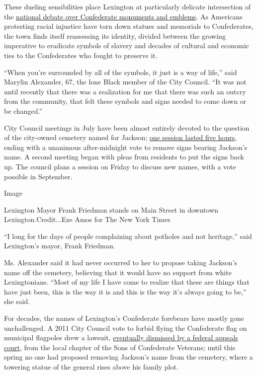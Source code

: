 These dueling sensibilities place Lexington at particularly delicate
intersection of the
\href{https://www.nytimes.com/2020/06/24/us/confederate-statues-photos.html}{national
debate over Confederate monuments and emblems}. As Americans protesting
racial injustice have torn down statues and memorials to Confederates,
the town finds itself reassessing its identity, divided between the
growing imperative to eradicate symbols of slavery and decades of
cultural and economic ties to the Confederates who fought to preserve
it.

``When you're surrounded by all of the symbols, it just is a way of
life,'' said Marylin Alexander, 67, the lone Black member of the City
Council. ``It was not until recently that there was a realization for me
that there was such an outcry from the community, that felt these
symbols and signs needed to come down or be changed.''

City Council meetings in July have been almost entirely devoted to the
question of the city-owned cemetery named for Jackson;
\href{https://www.youtube.com/watch?v=Ip6tg5VIbCE}{one session lasted
five hours}, ending with a unanimous after-midnight vote to remove signs
bearing Jackson's name. A second meeting began with pleas from residents
to put the signs back up. The council plans a session on Friday to
discuss new names, with a vote possible in September.

Image

Lexington Mayor Frank Friedman stands on Main Street in downtown
Lexington.Credit...Eze Amos for The New York Times

``I long for the days of people complaining about potholes and not
heritage,'' said Lexington's mayor, Frank Friedman.

Ms. Alexander said it had never occurred to her to propose taking
Jackson's name off the cemetery, believing that it would have no support
from white Lexingtonians. ``Most of my life I have come to realize that
these are things that have just been, this is the way it is and this is
the way it's always going to be,'' she said.

For decades, the names of Lexington's Confederate forebears have mostly
gone unchallenged. A 2011 City Council vote to forbid flying the
Confederate flag on municipal flagpoles drew a lawsuit,
\href{https://casetext.com/case/sons-of-confederate-veterans-v-city-of-lexington-2}{eventually
dismissed by a federal appeals court}, from the local chapter of the
Sons of Confederate Veterans; until this spring no one had proposed
removing Jackson's name from the cemetery, where a towering statue of
the general rises above his family plot.

